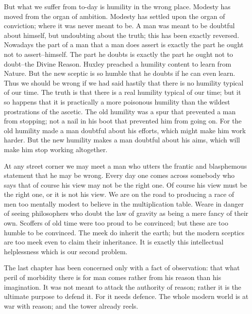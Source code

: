 \documentclass{book}
\begin{document}
But what we suffer from to-day is humility in the wrong place. Modesty has moved from the organ of ambition. Modesty has settled upon the organ of conviction; where it was never meant to be. A man was meant to be doubtful about himself, but undoubting about the truth; this has been exactly reversed. Nowadays the part of a man that a man does assert is exactly the part he ought not to assert–himself. The part he doubts is exactly the part he ought not to doubt–the Divine Reason. Huxley preached a humility content to learn from Nature. But the new sceptic is so humble that he doubts if he can even learn. Thus we should be wrong if we had said hastily that there is no humility typical of our time. The truth is that there is a real humility typical of our time; but it so happens that it is practically a more poisonous humility than the wildest prostrations of the ascetic. The old humility was a spur that prevented a man from stopping; not a nail in his boot that prevented him from going on. For the old humility made a man doubtful about his efforts, which might make him work harder. But the new humility makes a man doubtful about his aims, which will make him stop working altogether.

At any street corner we may meet a man who utters the frantic and blasphemous statement that he may be wrong. Every day one comes across somebody who says that of course his view may not be the right one. Of course his view must be the right one, or it is not his view. We are on the road to producing a race of men too mentally modest to believe in the multiplication table. Weare in danger of seeing philosophers who doubt the law of gravity as being a mere fancy of their own. Scoffers of old time were too proud to be convinced; but these are too humble to be convinced. The meek do inherit the earth; but the modern sceptics are too meek even to claim their inheritance. It is exactly this intellectual helplessness which is our second problem.

The last chapter has been concerned only with a fact of observation: that what peril of morbidity there is for man comes rather from his reason than his imagination. It was not meant to attack the authority of reason; rather it is the ultimate purpose to defend it. For it needs defence. The whole modern world is at war with reason; and the tower already reels.
\end{document}
